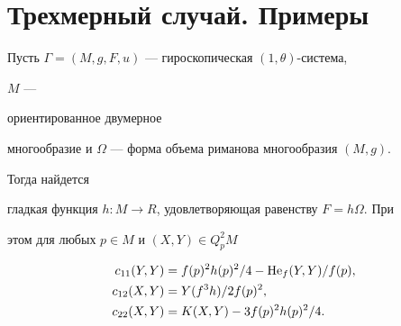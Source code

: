  


\section{Трехмерный случай. Примеры} 


 


Пусть $\Gamma=(M,g,F,u)$ --- гироскопическая $(1,\theta)$-система, 


$M$ --- 


ориентированное двумерное 


многообразие и $\Omega$ --- форма объема риманова многообразия $(M,g)$. 


Тогда найдется 


гладкая функция $h:M\to R$, удовлетворяющая равенству $F=h\Omega$. При 


этом для любых $p\in M$ и $(X,Y)\in Q^2_pM$ 


\begin{align} 


c_{11}(Y,Y)&=f(p)^2h(p)^2/4-\He_f(Y,Y)/f(p),\\ 


c_{12}(X,Y)&=Y(f^3h)/2f(p)^2,\\ 


c_{22}(X,Y)&=K(X,Y)-3f(p)^2h(p)^2/4. 


\end{align} 


 


